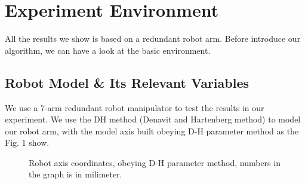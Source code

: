 \documentclass[letterpaper, 10 pt, conference]{ieeeconf}  %
\begin{document}
\section{Experiment Environment}

All the results we show is based on a redundant robot arm. Before introduce our algorithm, we can have a look at the basic environment.

\subsection{Robot Model \& Its Relevant Variables}

We use a 7-arm redundant robot manipulator to test the results in our experiment. We use the DH method (Denavit and Hartenberg method) to model our robot arm, with the model axis built obeying D-H parameter method as the Fig. 1 show.

   \begin{figure}[thpb]
      \centering
      \caption{Robot axis coordinates, obeying D-H parameter method, numbers in the graph is in milimeter.}
      \label{figurelabel}
   \end{figure}
   
\end{document}
